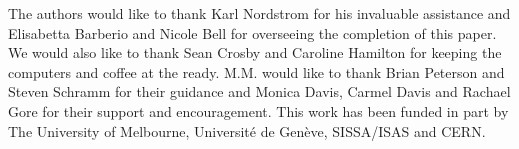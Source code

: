 The authors would like to thank Karl Nordstrom for his invaluable assistance and Elisabetta Barberio and Nicole Bell for overseeing the completion of this paper. We would also like to thank Sean Crosby and Caroline Hamilton for keeping the computers and coffee at the ready. M.M. would like to thank Brian Peterson and Steven Schramm for their guidance and Monica Davis, Carmel Davis and Rachael Gore for their support and encouragement. This work has been funded in part by The University of Melbourne, Universit\'{e} de Gen\`{e}ve, SISSA/ISAS and CERN.